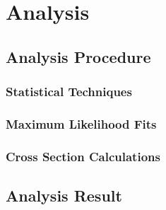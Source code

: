 \chapter{Analysis}
\label{analysis_chapter}

\section{Analysis Procedure}
\label{anaproc}
\subsection{Statistical Techniques}

\subsection{Maximum Likelihood Fits}

\subsection{Cross Section Calculations}

\section{Analysis Result}
\label{neymanana}

